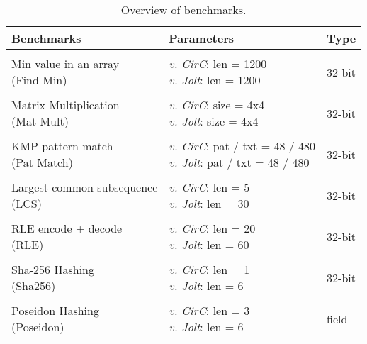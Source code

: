 \begin{table}[t]
  \begin{tabular}{l l l}
    \centering
    \textbf{Benchmarks} & \textbf{Parameters} & \textbf{Type} \\
    \hline \\
    \makecell[l]{Min value in an array \\ (Find Min)} & \makecell[l]{\emph{v. CirC}: len = 1200 \\ \emph{v. Jolt}: len = 1200} & 32-bit \\
    \vspace{2\baselineskip}\\
    \makecell[l]{Matrix Multiplication \\ (Mat Mult)} & \makecell[l]{\emph{v. CirC}: size = 4x4 \\ \emph{v. Jolt}: size = 4x4} & 32-bit \\
    \vspace{2\baselineskip}\\
    \makecell[l]{KMP pattern match \\ (Pat Match)} & \makecell[l]{\emph{v. CirC}: pat / txt = 48 / 480 \\ \emph{v. Jolt}: pat / txt = 48 / 480} & 32-bit \\
    \vspace{2\baselineskip}\\
    \makecell[l]{Largest common subsequence \\ (LCS)} & \makecell[l]{\emph{v. CirC}: len = 5 \\ \emph{v. Jolt}: len = 30} & 32-bit \\
    \vspace{2\baselineskip}\\
    \makecell[l]{RLE encode + decode \\ (RLE)} & \makecell[l]{\emph{v. CirC}: len = 20 \\ \emph{v. Jolt}: len = 60} & 32-bit \\
    \vspace{2\baselineskip}\\
    \makecell[l]{Sha-256 Hashing \\ (Sha256)} & \makecell[l]{\emph{v. CirC}: len = 1 \\ \emph{v. Jolt}: len = 6} & 32-bit \\
    \vspace{2\baselineskip}\\
    \makecell[l]{Poseidon Hashing \\ (Poseidon)} & \makecell[l]{\emph{v. CirC}: len = 3 \\ \emph{v. Jolt}: len = 6} & field \\
  \end{tabular}
  \caption{Overview of benchmarks.}
  \label{fig:benchmark_overview}
\end{table}